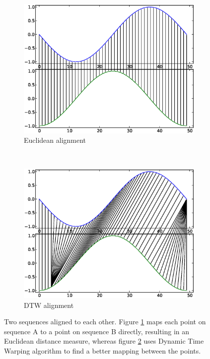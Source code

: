 \documentclass[parskip]{cs4rep}
\begin{document}
\begin{figure}[b,t]
   \centering
   \begin{subfigure}[b]{0.45\textwidth}
       \centering
       \includegraphics[width=\textwidth]{figures/DTW/sin-cos-no-dtw.eps}
       \caption{Euclidean alignment}
       \label{fig:DTW:euclidean_alignment}
   \end{subfigure}
   ~
   \begin{subfigure}[b]{0.45\textwidth}
       \centering
       \includegraphics[width=\textwidth]{figures/DTW/sin-cos-dtw.eps}
       \caption{DTW alignment}
       \label{fig:DTW:dtw_alignment}
   \end{subfigure}
   
   \caption{Two sequences aligned to each other. Figure \ref{fig:DTW:euclidean_alignment} maps each point on sequence A to a point on sequence B directly, resulting in an Euclidean distance measure, whereas figure \ref{fig:DTW:dtw_alignment} uses Dynamic Time Warping algorithm to find a better mapping between the points.}
   \label{fig:DTW:alignments}
\end{figure}
\end{document}
